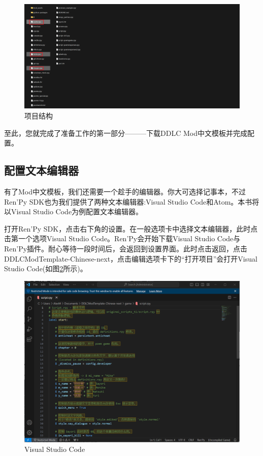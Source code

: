 \begin{figure}[htbp]
    \centering
    \includegraphics[scale=.2]{Pictures/2/2.1/2.1.2}
    \caption{项目结构}
    \label{fig:2.2}
\end{figure}

至此，您就完成了准备工作的第一部分———下载DDLC Mod中文模板并完成配置。

\subsection{配置文本编辑器}
有了Mod中文模板，我们还需要一个趁手的编辑器。你大可选择记事本，不过Ren'Py SDK也为我们提供了两种文本编辑器:Visual Studio Code和Atom。本书将以Visual Studio Code为例配置文本编辑器。

打开Ren'Py SDK，点击右下角的设置。在一般选项卡中选择文本编辑器，此时点击第一个选项Visual Studio Code。Ren'Py会开始下载Visual Studio Code与Ren'Py插件。耐心等待一段时间后，会返回到设置界面。此时点击返回，点击DDLCModTemplate-Chinese-next，点击编辑选项卡下的“打开项目”会打开Visual Studio Code(如图\ref{fig:2.3}所示)。

\begin{figure}[htbp]
    \centering
    \includegraphics[scale=.4]{Pictures/2/2.1/2.1.3}
    \caption{Visual Studio Code}
    \label{fig:2.3}
\end{figure}

